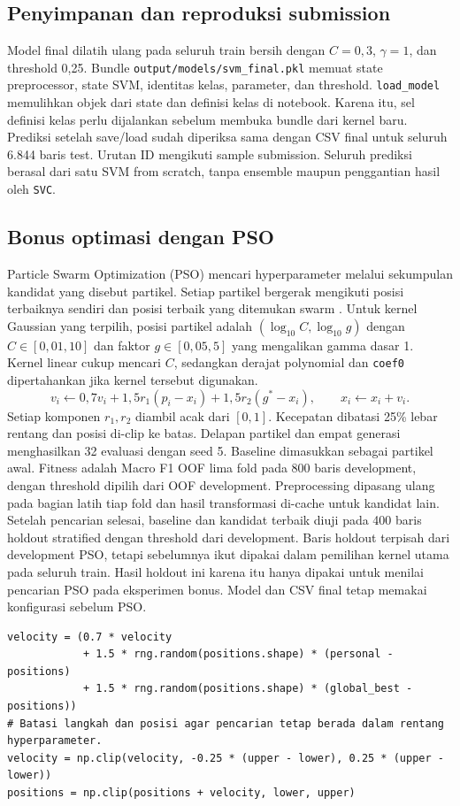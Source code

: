 \subsection{Penyimpanan dan reproduksi submission}
Model final dilatih ulang pada seluruh train bersih dengan $C=0{,}3$, $\gamma=1$, dan threshold 0,25. Bundle \texttt{output/models/svm\_final.pkl} memuat state preprocessor, state SVM, identitas kelas, parameter, dan threshold. \texttt{load\_model} memulihkan objek dari state dan definisi kelas di notebook. Karena itu, sel definisi kelas perlu dijalankan sebelum membuka bundle dari kernel baru. Prediksi setelah save/load sudah diperiksa sama dengan CSV final untuk seluruh 6.844 baris test. Urutan ID mengikuti sample submission. Seluruh prediksi berasal dari satu SVM from scratch, tanpa ensemble maupun penggantian hasil oleh \texttt{SVC}.

\subsection{Bonus optimasi dengan PSO}
Particle Swarm Optimization (PSO) mencari hyperparameter melalui sekumpulan kandidat yang disebut partikel. Setiap partikel bergerak mengikuti posisi terbaiknya sendiri dan posisi terbaik yang ditemukan swarm \cite{ref:pso,ref:pso_shi,ref:pso_svm}. Untuk kernel Gaussian yang terpilih, posisi partikel adalah $(\log_{10}C,\log_{10}g)$ dengan $C\in[0{,}01,10]$ dan faktor $g\in[0{,}05,5]$ yang mengalikan gamma dasar 1. Kernel linear cukup mencari $C$, sedangkan derajat polynomial dan \texttt{coef0} dipertahankan jika kernel tersebut digunakan.
\begin{equation}
v_i\leftarrow 0{,}7v_i+1{,}5r_1(p_i-x_i)+1{,}5r_2(g^*-x_i),\qquad x_i\leftarrow x_i+v_i.
\end{equation}
Setiap komponen $r_1,r_2$ diambil acak dari $[0,1]$. Kecepatan dibatasi 25\% lebar rentang dan posisi di-clip ke batas. Delapan partikel dan empat generasi menghasilkan 32 evaluasi dengan seed 5. Baseline dimasukkan sebagai partikel awal. Fitness adalah Macro F1 OOF lima fold pada 800 baris development, dengan threshold dipilih dari OOF development. Preprocessing dipasang ulang pada bagian latih tiap fold dan hasil transformasi di-cache untuk kandidat lain. Setelah pencarian selesai, baseline dan kandidat terbaik diuji pada 400 baris holdout stratified dengan threshold dari development. Baris holdout terpisah dari development PSO, tetapi sebelumnya ikut dipakai dalam pemilihan kernel utama pada seluruh train. Hasil holdout ini karena itu hanya dipakai untuk menilai pencarian PSO pada eksperimen bonus. Model dan CSV final tetap memakai konfigurasi sebelum PSO.
\begin{lstlisting}[caption={Pembaruan kecepatan dan posisi partikel pada PSO},label={lst:svm_pso}]
velocity = (0.7 * velocity
            + 1.5 * rng.random(positions.shape) * (personal - positions)
            + 1.5 * rng.random(positions.shape) * (global_best - positions))
# Batasi langkah dan posisi agar pencarian tetap berada dalam rentang hyperparameter.
velocity = np.clip(velocity, -0.25 * (upper - lower), 0.25 * (upper - lower))
positions = np.clip(positions + velocity, lower, upper)
\end{lstlisting}



